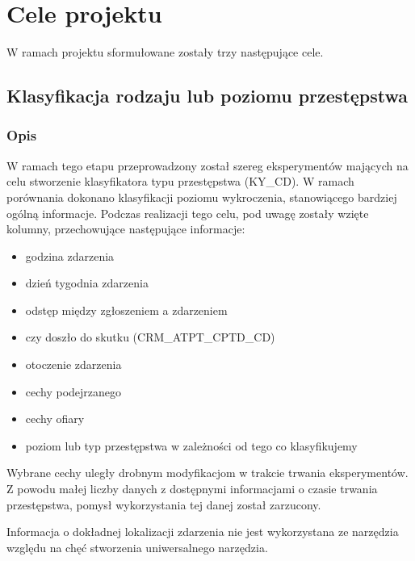 \documentclass{classrep}
\begin{document}
    \section{Cele projektu} \label{project_goals} {
        W ramach projektu sformułowane zostały trzy następujące cele.

        \subsection{Klasyfikacja rodzaju lub poziomu przestępstwa}
        \label{project_goal_1} {

            \subsubsection{Opis} {
                W ramach tego etapu przeprowadzony został szereg eksperymentów mających
                na celu stworzenie klasyfikatora typu przestępstwa (KY\_CD). W ramach
                porównania dokonano klasyfikacji poziomu wykroczenia,
                stanowiącego bardziej ogólną informacje. Podczas realizacji tego celu,
                pod uwagę zostały wzięte kolumny, przechowujące następujące informacje:
                \begin{itemize}
                    \item godzina zdarzenia
                    \item dzień tygodnia zdarzenia
                    \item odstęp między zgłoszeniem a zdarzeniem
                    \item czy doszło do skutku (CRM\_ATPT\_CPTD\_CD)
                    \item otoczenie zdarzenia
                    \item cechy podejrzanego
                    \item cechy ofiary
                    \item poziom lub typ przestępstwa w zależności od tego co klasyfikujemy
                \end{itemize}

                Wybrane cechy uległy drobnym modyfikacjom w trakcie trwania
                eksperymentów.
                Z powodu małej liczby danych z dostępnymi informacjami o czasie trwania
                przestępstwa, pomysł wykorzystania tej danej został zarzucony.

                Informacja o dokładnej lokalizacji zdarzenia nie jest wykorzystana ze
                narzędzia względu na chęć stworzenia uniwersalnego narzędzia.

}}}
\end{document}
